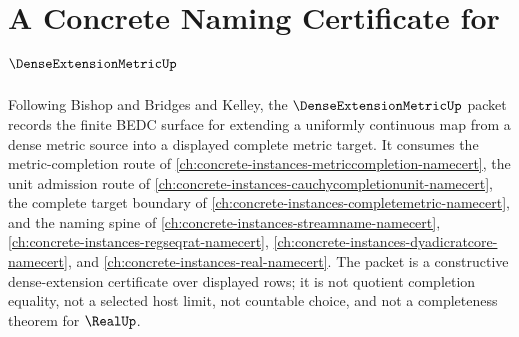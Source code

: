 \chapter{A Concrete Naming Certificate for $\DenseExtensionMetricUp$}
\label{ch:concrete-instances-dense-extension-metric-namecert}

Following Bishop and Bridges and Kelley, the $\DenseExtensionMetricUp$ packet records the finite BEDC surface for extending a uniformly continuous map from a dense metric source into a displayed complete metric target. It consumes the metric-completion route of \autoref{ch:concrete-instances-metriccompletion-namecert}, the unit admission route of \autoref{ch:concrete-instances-cauchycompletionunit-namecert}, the complete target boundary of \autoref{ch:concrete-instances-completemetric-namecert}, and the naming spine of \autoref{ch:concrete-instances-streamname-namecert}, \autoref{ch:concrete-instances-regseqrat-namecert}, \autoref{ch:concrete-instances-dyadicratcore-namecert}, and \autoref{ch:concrete-instances-real-namecert}. The packet is a constructive dense-extension certificate over displayed rows; it is not quotient completion equality, not a selected host limit, not countable choice, and not a completeness theorem for $\RealUp$.

